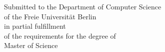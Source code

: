 \begin{titlepage}
    \makeatletter
    \begin{center}
        \vspace*{2cm}

        {\Large \@title}
        \vspace*{1cm}

        {\large \@author}

        \vspace*{\fill}

            Submitted to the Department of Computer Science\\
            of the Freie Universität Berlin\\
            in partial fulfillment\\
            of the requirements for the degree of\\
            Master of Science

        \vspace*{\fill}

        \@date
        \vspace*{2cm}
    \end{center}

    \makeatother
\end{titlepage}

